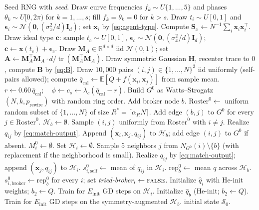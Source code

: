 \documentclass[11pt]{article}
\providecommand{\cref}[1]{\ref{#1}}
\newcommand{\x}{\mathbf{x}}
\newcommand{\A}{\mathbf{A}}
\newcommand{\B}{\mathbf{B}}
\newcommand{\Sx}{\mathbf{S}_x}
\newcommand{\Roster}{\mathrm{Roster}}
\newcommand{\Hist}{\mathcal{H}}
\newcommand{\qhat}{\hat{q}}
\newcommand{\rep}{\mathrm{rep}}
\newcommand{\R}{\mathbb{R}}
\newcommand{\self}{\mathrm{self}}
\newcommand{\brk}{\mathrm{broker}}
\newcommand{\Ntot}{N}
\DeclareMathOperator{\tr}{tr}
\begin{document}
\begin{algorithm}[H]
\caption{\textsc{Initialize}$(\Theta,\text{seed})\to\mathcal{S}_0$. $\Theta$ is the full parameter dictionary.}\label{alg:init}
\begin{algorithmic}[1]
\STATE Seed RNG with \textit{seed}.
\STATE Draw curve frequencies $f_k\sim U\{1,\ldots,5\}$ and phases $\theta_k\sim U[0,2\pi)$ for $k=1,\ldots,s$; fill $f_k=\theta_k=0$ for $k>s$.
\FORALL{$i\in\{1,\ldots,\Ntot\}$}
  \STATE Draw $t_i\sim U[0,1]$ and $\boldsymbol\epsilon_i\sim\mathcal{N}(\mathbf{0},(\sigma_x^2/d)\mathbf{I}_d)$; set $\x_i$ by \cref{eq:agent-type}.
\ENDFOR
\STATE Compute $\Sx \gets \Ntot^{-1}\sum_i \x_i\x_i^\top$.
\STATE Draw ideal type $\mathbf{c}$: sample $t_c\sim U[0,1]$, $\boldsymbol\epsilon_c\sim\mathcal{N}(\mathbf{0},(\sigma_x^2/d)\mathbf{I}_d)$; $\mathbf{c}\gets\x(t_c)+\boldsymbol\epsilon_c$.
\STATE Draw $\mathbf{M}_A\in\R^{d\times d}$ iid $\mathcal{N}(0,1)$; set $\A\gets \mathbf{M}_A^\top\mathbf{M}_A\cdot d/\tr(\mathbf{M}_A^\top\mathbf{M}_A)$.
\STATE Draw symmetric Gaussian $\mathbf{H}$, recenter trace to $0$, compute $\B$ by \cref{eq:B}.
\STATE {}
\STATE Draw $10{,}000$ pairs $(i,j)\in\{1,\ldots,\Ntot\}^2$ iid uniformly (self-pairs allowed); compute $\bar q_{\text{cal}}\gets\mathbb{E}[Q+f(\x_i,\x_j)]$ from sample mean.
\STATE $r\gets 0.60\,\bar q_{\text{cal}};\quad \phi\gets c_s\gets \lambda_c(\bar q_{\text{cal}}-r)$.
\STATE {}
\STATE Build $G^0$ as Watts--Strogatz$(\Ntot,k,p_{\text{rewire}})$ with random ring order. Add broker node $b$.
\STATE {}
\STATE $\Roster^0\gets$ uniform random subset of $\{1,\ldots,\Ntot\}$ of size $R^*=\lceil\alpha_R\Ntot\rceil$.
\STATE Add edge $(b,j)$ to $G^0$ for every $j\in\Roster^0$.
\STATE $\Hist_b\gets\emptyset$.
  \STATE Sample $(i,j)$ uniformly from $\Roster^0$ with $i\neq j$.
  \STATE Realize $q_{ij}$ by \cref{eq:match-output}.
  \STATE Append $(\x_i,\x_j,q_{ij})$ to $\Hist_b$; add edge $(i,j)$ to $G^0$ if absent.
\ENDFOR
\STATE {}
\FORALL{$i\in\{1,\ldots,\Ntot\}$}
  \STATE $M_i^0\gets\emptyset$. Set $\Hist_i\gets\emptyset$.
  \STATE Sample $5$ neighbors $j$ from $N_{G^0}(i)\setminus\{b\}$ (with replacement if the neighborhood is small).
    \STATE Realize $q_{ij}$ by \cref{eq:match-output}; append $(\x_j,q_{ij})$ to $\Hist_i$.
  \ENDFOR
  \STATE $s_{i,\self}^0 \gets$ mean of $q_{ij}$ in $\Hist_i$.
\ENDFOR
\STATE $\rep_b^0 \gets$ mean $q$ across $\Hist_b$.
\STATE $s_{i,\brk}^0 \gets \rep_b^0$ for every $i$; set \emph{tried-broker}$_i\gets\textsc{false}$.
\STATE {}
\FORALL{$i\in\{1,\ldots,\Ntot\}$}
  \STATE Initialize $\qhat_i$ with He-init weights; $b_2\gets Q$. Train for $E_{\text{init}}$ GD steps on $\Hist_i$.
\ENDFOR
\STATE Initialize $\qhat_b$ (He-init; $b_2\gets Q$). Train for $E_{\text{init}}$ GD steps on the symmetry-augmented $\Hist_b$.
\RETURN initial state $\mathcal{S}_0$.
\end{algorithmic}
\end{algorithm}
\end{document}
